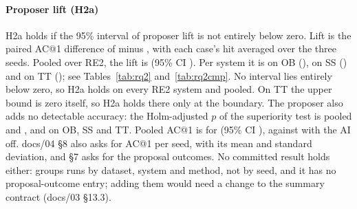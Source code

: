 \paragraph{Proposer lift (H2a)}
H2a holds if the 95\% interval of proposer lift is not entirely below zero.
Lift is the paired AC@1 difference of  minus , with each case's hit averaged over the three seeds.
Pooled over RE2, the lift is  (95\% CI ).
Per system it is  on OB (),  on SS () and  on TT (); see Tables~\ref{tab:rq2} and~\ref{tab:rq2cmp}.
No interval lies entirely below zero, so H2a holds on every RE2 system and pooled.
On TT the upper bound is zero itself, so H2a holds there only at the boundary.
The proposer also adds no detectable accuracy: the Holm-adjusted $p$ of the superiority test is  pooled and ,  and  on OB, SS and TT.
Pooled AC@1 is  for  (95\% CI ), against  with the AI off.
docs/04 §8 also asks for AC@1 per seed, with its mean and standard deviation, and §7 asks for the proposal outcomes.
No committed result holds either:  groups runs by dataset, system and method, not by seed, and it has no proposal-outcome entry; adding them would need a change to the summary contract (docs/03 §13.3).

